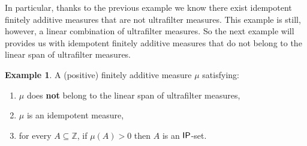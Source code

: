 \documentclass{jloganal}
\theoremstyle{definition}
\newtheorem{ex}[thm]{Example}
\newcommand{\ip}{\mathnormal{\mathsf{IP}}}
\begin{document}
In particular, thanks to the previous example we know there exist idempotent finitely additive measures that are not ultrafilter measures. This example is still, however, a linear combination of ultrafilter measures. So the next example will provides us with idempotent finitely additive measures that do not belong to the linear span of ultrafilter measures.




\begin{ex}\label{infinite-linear-comb}
     A (positive) finitely additive measure $\mu$ satisfying:
\begin{enumerate}
    \item $\mu$ does {\bf not} belong to the linear span of ultrafilter measures,
    \item $\mu$ is an idempotent measure,
    \item for every $A\subseteq\mathbb Z$, if $\mu(A)>0$ then $A$ is an $\ip$-set.
\end{enumerate}
\end{ex}
\end{document}
